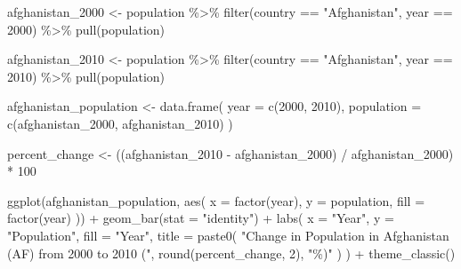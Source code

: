 \documentclass[
  letterpaper,
  DIV=11,
  numbers=noendperiod]{scrreprt}
\newenvironment{Shaded}{\begin{snugshade}}{\end{snugshade}}
\newcommand{\AttributeTok}[1]{\textcolor[rgb]{0.40,0.45,0.13}{#1}}
\newcommand{\DecValTok}[1]{\textcolor[rgb]{0.68,0.00,0.00}{#1}}
\newcommand{\FunctionTok}[1]{\textcolor[rgb]{0.28,0.35,0.67}{#1}}
\newcommand{\NormalTok}[1]{\textcolor[rgb]{0.00,0.23,0.31}{#1}}
\newcommand{\OtherTok}[1]{\textcolor[rgb]{0.00,0.23,0.31}{#1}}
\newcommand{\SpecialCharTok}[1]{\textcolor[rgb]{0.37,0.37,0.37}{#1}}
\newcommand{\StringTok}[1]{\textcolor[rgb]{0.13,0.47,0.30}{#1}}
\begin{document}
\begin{Shaded}
\begin{Highlighting}[]
\NormalTok{afghanistan\_2000 }\OtherTok{\textless{}{-}}\NormalTok{ population }\SpecialCharTok{\%\textgreater{}\%}
  \FunctionTok{filter}\NormalTok{(country }\SpecialCharTok{==} \StringTok{"Afghanistan"}\NormalTok{, year }\SpecialCharTok{==} \DecValTok{2000}\NormalTok{) }\SpecialCharTok{\%\textgreater{}\%}
  \FunctionTok{pull}\NormalTok{(population)}

\NormalTok{afghanistan\_2010 }\OtherTok{\textless{}{-}}\NormalTok{ population }\SpecialCharTok{\%\textgreater{}\%}
  \FunctionTok{filter}\NormalTok{(country }\SpecialCharTok{==} \StringTok{"Afghanistan"}\NormalTok{, year }\SpecialCharTok{==} \DecValTok{2010}\NormalTok{) }\SpecialCharTok{\%\textgreater{}\%}
  \FunctionTok{pull}\NormalTok{(population)}

\NormalTok{afghanistan\_population }\OtherTok{\textless{}{-}} \FunctionTok{data.frame}\NormalTok{(}
  \AttributeTok{year =} \FunctionTok{c}\NormalTok{(}\DecValTok{2000}\NormalTok{, }\DecValTok{2010}\NormalTok{),}
  \AttributeTok{population =} \FunctionTok{c}\NormalTok{(afghanistan\_2000, afghanistan\_2010)}
\NormalTok{)}

\NormalTok{percent\_change }\OtherTok{\textless{}{-}}
\NormalTok{  ((afghanistan\_2010 }\SpecialCharTok{{-}}\NormalTok{ afghanistan\_2000) }\SpecialCharTok{/}\NormalTok{ afghanistan\_2000) }\SpecialCharTok{*} \DecValTok{100}

\FunctionTok{ggplot}\NormalTok{(afghanistan\_population,}
       \FunctionTok{aes}\NormalTok{(}
         \AttributeTok{x =} \FunctionTok{factor}\NormalTok{(year),}
         \AttributeTok{y =}\NormalTok{ population,}
         \AttributeTok{fill =} \FunctionTok{factor}\NormalTok{(year)}
\NormalTok{       )) }\SpecialCharTok{+}
  \FunctionTok{geom\_bar}\NormalTok{(}\AttributeTok{stat =} \StringTok{"identity"}\NormalTok{) }\SpecialCharTok{+}
  \FunctionTok{labs}\NormalTok{(}
    \AttributeTok{x =} \StringTok{"Year"}\NormalTok{,}
    \AttributeTok{y =} \StringTok{"Population"}\NormalTok{,}
    \AttributeTok{fill =} \StringTok{"Year"}\NormalTok{,}
    \AttributeTok{title =} \FunctionTok{paste0}\NormalTok{(}
      \StringTok{"Change in Population in Afghanistan (AF) from 2000 to 2010 ("}\NormalTok{,}
      \FunctionTok{round}\NormalTok{(percent\_change, }\DecValTok{2}\NormalTok{),}
      \StringTok{"\%)"}
\NormalTok{    )}
\NormalTok{  ) }\SpecialCharTok{+}
  \FunctionTok{theme\_classic}\NormalTok{()}
\end{Highlighting}
\end{Shaded}
\end{document}
